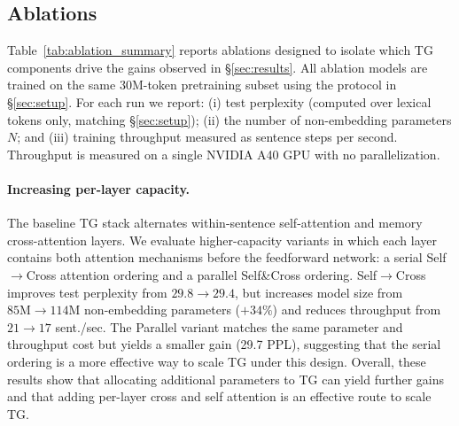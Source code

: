 \documentclass{article}
\begin{document}
\subsection{Ablations}
\label{sec:results-ablations}

Table~\ref{tab:ablation_summary} reports ablations designed to isolate which TG components drive the gains observed in \S\ref{sec:results}. All ablation models are trained on the same $30\mathrm{M}$-token pretraining subset using the protocol in \S\ref{sec:setup}. For each run we report: (i) test perplexity (computed over lexical tokens only, matching \S\ref{sec:setup}); (ii) the number of non-embedding parameters $N$; and (iii) training throughput measured as sentence steps per second. Throughput is measured on a single NVIDIA A40 GPU with no parallelization.


\paragraph{Increasing per-layer capacity.}
The baseline TG stack alternates within-sentence self-attention and memory cross-attention layers. We evaluate higher-capacity variants in which each layer contains both attention mechanisms before the feedforward network: a serial Self$\rightarrow$Cross attention ordering and a parallel Self\&Cross ordering. Self$\rightarrow$Cross improves test perplexity from $29.8 \rightarrow 29.4$, but increases model size from $85\mathrm{M} \rightarrow 114\mathrm{M}$ non-embedding parameters ($+34\%$) and reduces throughput from $21 \rightarrow 17$ sent./sec. The Parallel variant matches the same parameter and throughput cost but yields a smaller gain (29.7 PPL), suggesting that the serial ordering is a more effective way to scale TG under this design. Overall, these results show that allocating additional parameters to TG can yield further gains and that adding per-layer cross and self attention is an effective route to scale TG.
\end{document}
